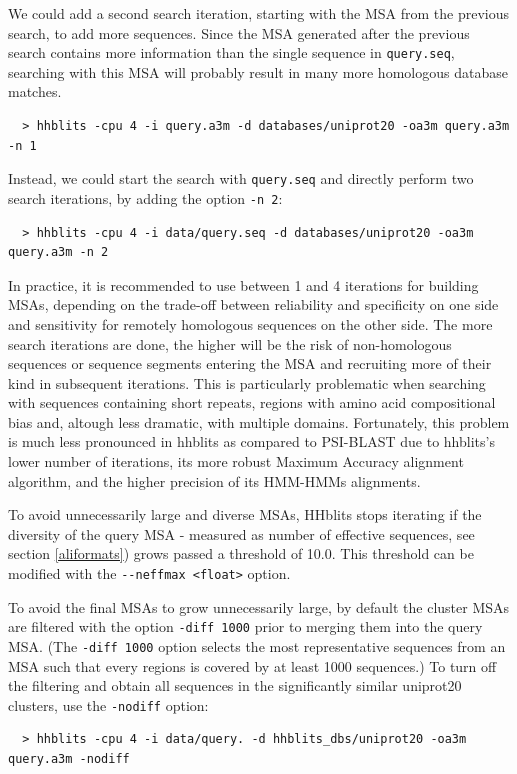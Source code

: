 \documentclass[11pt,a4paper]{article}
\begin{document}
We could add a second search iteration, starting with the MSA from the previous search, to add more sequences. Since the MSA generated after the previous search contains more information than the single sequence in \verb`query.seq`, searching with this MSA will probably result in many more homologous database matches.
\begin{verbatim}
  > hhblits -cpu 4 -i query.a3m -d databases/uniprot20 -oa3m query.a3m -n 1
\end{verbatim}

Instead, we could start the search with \verb`query.seq` and directly perform two search iterations, by adding the option \verb`-n 2`:
\begin{verbatim}
  > hhblits -cpu 4 -i data/query.seq -d databases/uniprot20 -oa3m query.a3m -n 2 
\end{verbatim}

In practice, it is recommended to use between 1 and 4 iterations for building MSAs, depending on the trade-off between reliability and specificity on one side and sensitivity for remotely homologous sequences on the other side. The more search iterations are done, the higher will be the risk of non-homologous sequences or sequence segments entering the MSA and recruiting more of their kind in subsequent iterations. This is particularly problematic when searching with sequences containing short repeats, regions with amino acid compositional bias and, altough less dramatic,  with multiple domains. Fortunately, this problem is much less pronounced in hhblits as compared to PSI-BLAST due to hhblits's lower number of iterations, its more robust Maximum Accuracy alignment algorithm, and the higher precision of its HMM-HMMs alignments. 

To avoid unnecessarily large and diverse MSAs, HHblits stops iterating if the diversity of the query MSA - measured as number of effective sequences, see section \ref{aliformats}) grows passed a threshold of 10.0. This threshold can be modified with the \verb`--neffmax <float>` option.

To avoid the final MSAs to grow unnecessarily large, by default the cluster MSAs are filtered with the option \verb`-diff 1000` prior to merging them into the query MSA. (The \verb`-diff 1000` option selects the most representative sequences from an MSA such that every regions is covered by at least 1000 sequences.) To turn off the filtering and obtain all sequences in the significantly similar uniprot20 clusters, use the \verb`-nodiff` option: 
\begin{verbatim}
  > hhblits -cpu 4 -i data/query. -d hhblits_dbs/uniprot20 -oa3m query.a3m -nodiff
\end{verbatim}
\end{document}

